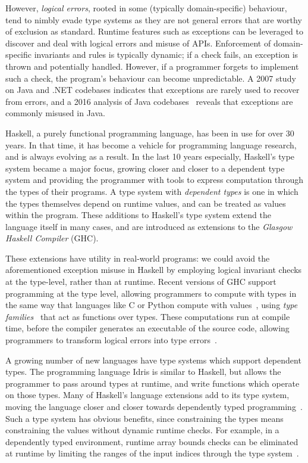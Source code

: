 However, \emph{logical errors}, rooted in some (typically domain-specific) behaviour, tend to nimbly evade type systems as they are not general errors that are worthy of exclusion as standard. Runtime features such as exceptions can be leveraged to discover and deal with logical errors and misuse of APIs. Enforcement of domain-specific invariants and rules is typically dynamic; if a check fails, an exception is thrown and potentially handled. However, if a programmer forgets to implement such a check, the program's behaviour can become unpredictable. A 2007 study~\cite{exceptionsusedpoorly} on Java and .NET codebases indicates that exceptions are rarely used to recover from errors, and a 2016 analysis of Java codebases~\cite{badjavaexceptions} reveals that exceptions are commonly misused in Java.

Haskell, a purely functional programming language, has been in use for over 30 years. In that time, it has become a vehicle for programming language research, and is always evolving as a result. In the last 10 years especially, Haskell's type system became a major focus, growing closer and closer to a dependent type system and providing the programmer with tools to express computation through the types of their programs. A type system with \emph{dependent types} is one in which the types themselves depend on runtime values, and can be treated as values within the program. These additions to Haskell's type system extend the language itself in many cases, and are introduced as extensions to the \emph{Glasgow Haskell Compiler} (GHC).

These extensions have utility in real-world programs: we could avoid the aforementioned exception misuse in Haskell by employing logical invariant checks at the type-level, rather than at runtime. Recent versions of GHC support programming at the type level, allowing programmers to compute with types in the same way that languages like C or Python compute with values~\cite{givingpromotion}, using \emph{type families}~\cite{opentfs,closedtfs} that act as functions over types. These computations run at compile time, before the compiler generates an executable of the source code, allowing programmers to transform logical errors into type errors~\cite{twt}.

A growing number of new languages have type systems which support dependent types. The programming language Idris is similar to Haskell, but allows the programmer to pass around types at runtime, and write functions which operate on those types. Many of Haskell's language extensions add to its type system, moving the language closer and closer towards dependently typed programming~\cite{singletons}. Such a type system has obvious benefits, since constraining the types means constraining the values without dynamic runtime checks. For example, in a dependently typed environment, runtime array bounds checks can be eliminated at runtime by limiting the ranges of the input indices through the type system~\cite{dependentarray}.

